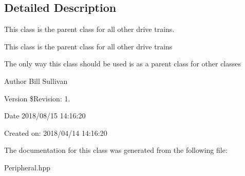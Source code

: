 \subsection{Detailed Description}
This class is the parent class for all other drive trains. 

This class is the parent class for all other drive trains

The only way this class should be used is as a parent class for other classes

\begin{DoxyAuthor}{Author}
Bill Sullivan
\end{DoxyAuthor}
\begin{DoxyVersion}{Version}
\$\+Revision\+: 1.
\end{DoxyVersion}
\begin{DoxyDate}{Date}
2018/08/15 14\+:16\+:20
\end{DoxyDate}
Created on\+: 2018/04/14 14\+:16\+:20 

The documentation for this class was generated from the following file\+:\begin{DoxyCompactItemize}
\item 
Peripheral.\+hpp\end{DoxyCompactItemize}
